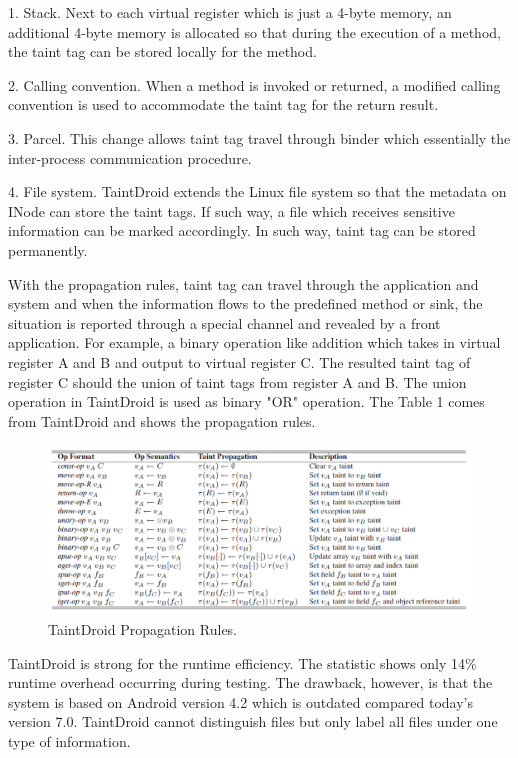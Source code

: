 \documentclass{article}
\begin{document}
1. Stack. Next to each virtual register which is just a 4-byte memory, an additional 4-byte memory is allocated so that during the execution of a method, the taint tag can be stored locally for the method.

2. Calling convention. When a method is invoked or returned, a modified calling convention is used to accommodate the taint tag for the return result.

3. Parcel. This change allows taint tag travel through binder which essentially the inter-process communication procedure.

4. File system. TaintDroid extends the Linux file system so that the metadata on INode can store the taint tags. If such way, a file which receives sensitive information can be marked accordingly. In such way, taint tag can be stored permanently.

With the propagation rules, taint tag can travel through the application and system and when
the information flows to the predefined method or sink, the situation is reported through a special channel and revealed by a front application. For example, a binary operation like addition which takes in virtual register A and B and output to virtual register C. The resulted taint tag of register C should the union of taint tags from register A and B. The union operation in TaintDroid is used as binary "OR" operation. The Table 1 comes from TaintDroid and shows the propagation rules.

\begin{figure}[ht]
  \centering
  \includegraphics[scale=0.4]{TaintDroid2.png}
  \caption{TaintDroid Propagation Rules.}
  \label{fig:TaintDroid}
\end{figure}

TaintDroid is strong for the runtime efficiency. The statistic shows only 14\% runtime overhead occurring during testing. The drawback, however, is that the system is based on Android version 4.2 which is outdated compared today's version 7.0. TaintDroid cannot distinguish files but only label all files under one type of information.
\end{document}

